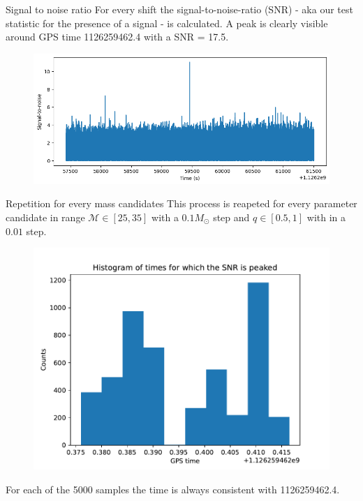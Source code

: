 \documentclass[
10pt,
aspectratio=169,
]{beamer}
\begin{document}
\begin{frame}{Signal to noise ratio}
    For every shift the signal-to-noise-ratio (SNR) - aka our test statistic for the presence of a signal - is calculated. A peak is clearly visible around GPS time 1126259462.4 with a SNR = 17.5.
\begin{figure}
    \centering
    \includegraphics[width=\textwidth]{snr_peak.png}
\end{figure}
\end{frame}

\begin{frame}{Repetition for every mass candidates}
This process is reapeted for every parameter candidate in range $\mathcal{M} \in [25,35]$ with a $0.1 M_\odot$ step and $q \in [0.5,1]$ with in a $0.01$ step.
\begin{figure}
    \centering
    \includegraphics[width=0.8\textheight]{hist_time.pdf}
\end{figure}
For each of the 5000 samples the time is always consistent with 1126259462.4.
\end{frame}
\end{document}
